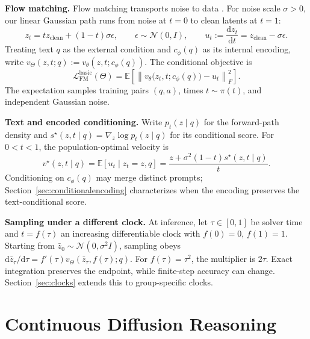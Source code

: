 \documentclass{article}
\newcommand{\E}{\mathbb{E}}
\begin{document}
\textbf{Flow matching.}
Flow matching transports noise to data \citep{flowmatching}. For noise scale $\sigma>0$, our linear Gaussian path runs from noise at $t=0$ to clean latents at $t=1$:
\begin{equation}
 z_t=t z_{\mathrm{clean}}+(1-t)\sigma\epsilon,
 \qquad \epsilon\sim\mathcal N(0,I),\qquad
 u_t:=\frac{\mathrm d z_t}{\mathrm d t}=z_{\mathrm{clean}}-\sigma\epsilon.
 \label{eq:methodinterpolant}
\end{equation}
Treating text $q$ as the external condition and $c_\phi(q)$ as its internal encoding, write $v_\Theta(z,t;q):=v_\theta(z,t;c_\phi(q))$. The conditional objective is
\begin{equation}
 \mathcal L_{\mathrm{FM}}^{\mathrm{basic}}(\Theta)
 =\E\!\left[\left\|v_\theta\bigl(z_t,t;c_\phi(q)\bigr)-u_t\right\|_F^2\right].
 \label{eq:basicflowloss}
\end{equation}
The expectation samples training pairs $(q,a)$, times $t\sim\pi(t)$, and independent Gaussian noise.

\textbf{Text and encoded conditioning.}
Write $p_t(z\mid q)$ for the forward-path density and $s^\star(z,t\mid q)=\nabla_z\log p_t(z\mid q)$ for its conditional score. For $0<t<1$, the population-optimal velocity is
\begin{equation}
 v^\star(z,t\mid q)
 =\E[u_t\mid z_t=z,q]
 =\frac{z+\sigma^2(1-t)s^\star(z,t\mid q)}{t}.
 \label{eq:conditionalflowscore}
\end{equation}
Conditioning on $c_\phi(q)$ may merge distinct prompts; Section~\ref{sec:conditionalencoding} characterizes when the encoding preserves the text-conditional score.

\textbf{Sampling under a different clock.}
At inference, let $\tau\in[0,1]$ be solver time and $t=f(\tau)$ an increasing differentiable clock with $f(0)=0$, $f(1)=1$. Starting from $\bar z_0\sim\mathcal N(0,\sigma^2I)$, sampling obeys $\mathrm d\bar z_\tau/\mathrm d\tau=f'(\tau)v_\Theta(\bar z_\tau,f(\tau);q)$. For $f(\tau)=\tau^2$, the multiplier is $2\tau$. Exact integration preserves the endpoint, while finite-step accuracy can change. Section~\ref{sec:clocks} extends this to group-specific clocks.

\section{Continuous Diffusion Reasoning}
\label{sec:methodology}
\label{sec:methodflow}
\end{document}
